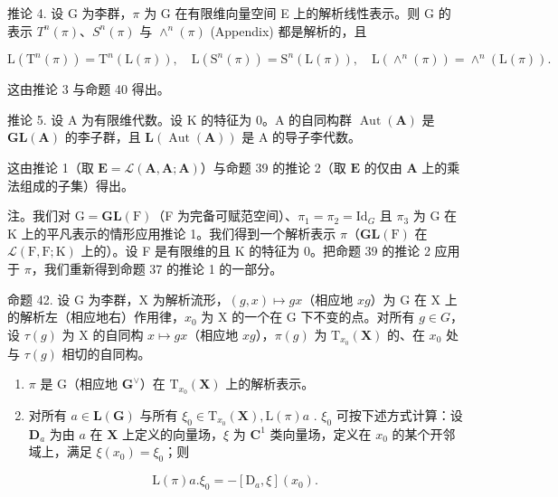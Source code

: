 推论 4. 设 G 为李群，\(\pi\) 为 G 在有限维向量空间 E 上的解析线性表示。则 G 的表示 \(T^{n}(\pi)\)、\(S^{n}(\pi)\) 与 \(\wedge^{n}(\pi)\) (Appendix) 都是解析的，且

\[
\mathrm{L} \left(\mathrm{T} ^ {n} (\pi)\right) = \mathrm{T} ^ {n} (\mathrm{L} (\pi)), \quad \mathrm{L} \left(\mathrm{S} ^ {n} (\pi)\right) = \mathrm{S} ^ {n} (\mathrm{L} (\pi)), \quad \mathrm{L} \left(\wedge^ {n} (\pi)\right) = \wedge^ {n} (\mathrm{L} (\pi)).
\]

这由推论 3 与命题 40 得出。

推论 5. 设 A 为有限维代数。设 K 的特征为 0。A 的自同构群 \(\operatorname{Aut}(\mathbf{A})\) 是 \(\mathbf{GL}(\mathbf{A})\) 的李子群，且 \(\mathbf{L}(\operatorname{Aut}(\mathbf{A}))\) 是 A 的导子李代数。

这由推论 1（取 \(\mathbf{E} = \mathcal{L}(\mathbf{A},\mathbf{A};\mathbf{A})\)）与命题 39 的推论 2（取 \(\mathbf{E}\) 的仅由 \(\mathbf{A}\) 上的乘法组成的子集）得出。

注。我们对 \(\mathrm{G} = \mathbf{GL}(\mathrm{F})\)（F 为完备可赋范空间）、\(\pi_1 = \pi_2 = \mathrm{Id}_{G}\) 且 \(\pi_3\) 为 G 在 K 上的平凡表示的情形应用推论 1。我们得到一个解析表示 \(\pi\)（\(\mathbf{GL}(\mathrm{F})\) 在 \(\mathcal{L}(\mathrm{F},\mathrm{F};\mathrm{K})\) 上的）。设 F 是有限维的且 K 的特征为 0。把命题 39 的推论 2 应用于 \(\pi\)，我们重新得到命题 37 的推论 1 的一部分。

命题 42. 设 G 为李群，X 为解析流形，\((g,x)\mapsto gx\)（相应地 \(xg\)）为 G 在 X 上的解析左（相应地右）作用律，\(x_0\) 为 X 的一个在 G 下不变的点。对所有 \(g\in G\)，设 \(\tau (g)\) 为 X 的自同构 \(x\mapsto gx\)（相应地 \(xg\)），\(\pi (g)\) 为 \(\mathrm{T}_{x_0}(\mathbf{X})\) 的、在 \(x_0\) 处与 \(\tau (g)\) 相切的自同构。

\begin{enumerate}
\def\labelenumi{(\roman{enumi})}
\item
  \(\pi\) 是 G（相应地 \(\mathbf{G}^{\vee}\)）在 \(\mathrm{T}_{x_0}(\mathbf{X})\) 上的解析表示。
\item
  对所有 \(a \in \mathbf{L}(\mathbf{G})\) 与所有 \(\xi_0 \in \mathrm{T}_{x_0}(\mathbf{X}), \mathrm{L}(\pi)a\) . \(\xi_0\) 可按下述方式计算：设 \(\mathbf{D}_a\) 为由 \(a\) 在 \(\mathbf{X}\) 上定义的向量场，\(\xi\) 为 \(\mathbf{C}^1\) 类向量场，定义在 \(x_0\) 的某个开邻域上，满足 \(\xi(x_0) = \xi_0\)；则
\end{enumerate}

\[
\mathrm{L} (\pi) a. \xi_ {0} = - [ \mathrm{D} _ {a}, \xi ] (x _ {0}).
\]

